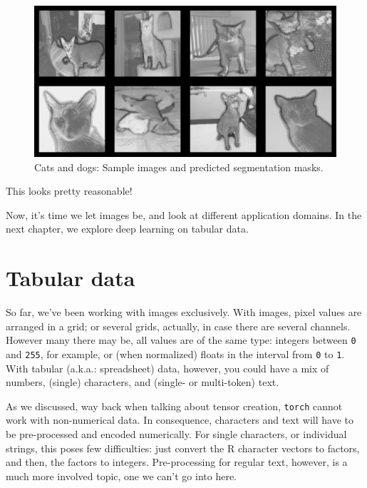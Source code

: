 \documentclass[
  letterpaper,
]{krantz}
\begin{document}
\begin{figure}[H]

{\centering \includegraphics{images/segmentation-segmentation.png}

}

\caption{\label{fig-segmentation-segmentation}Cats and dogs: Sample
images and predicted segmentation masks.}

\end{figure}

This looks pretty reasonable!

Now, it's time we let images be, and look at different application
domains. In the next chapter, we explore deep learning on tabular data.

\hypertarget{sec:tabular-data}{%
\chapter{Tabular data}\label{sec:tabular-data}}

So far, we've been working with images exclusively. With images, pixel
values are arranged in a grid; or several grids, actually, in case there
are several channels. However many there may be, all values are of the
same type: integers between \texttt{0} and \texttt{255}, for example, or
(when normalized) floats in the interval from \texttt{0} to \texttt{1}.
With tabular (a.k.a.: spreadsheet) data, however, you could have a mix
of numbers, (single) characters, and (single- or multi-token) text.

As we discussed, way back when talking about tensor creation,
\texttt{torch} cannot work with non-numerical data. In consequence,
characters and text will have to be pre-processed and encoded
numerically. For single characters, or individual strings, this poses
few difficulties: just convert the R character vectors to factors, and
then, the factors to integers. Pre-processing for regular text, however,
is a much more involved topic, one we can't go into here.
\end{document}
